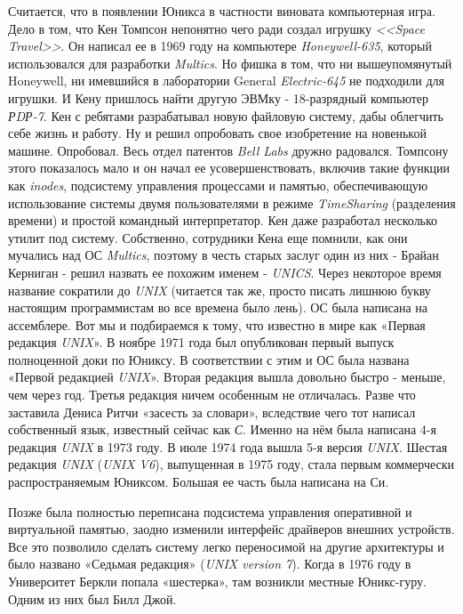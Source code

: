 Считается, что в появлении Юникса в частности виновата компьютерная игра. Дело в том, что Кен Томпсон непонятно чего ради создал игрушку \textit{<<Space Travel>>}. Он написал ее в 1969 году на компьютере \textit{Honeywell-635}, который использовался для разработки \textit{Multics}. Но фишка в том, что ни вышеупомянутый Honeywell, ни имевшийся в лаборатории General \textit{Electric-645} не подходили для игрушки. И Кену пришлось найти другую ЭВМку - 18-разрядный компьютер \textit{РDР-7}. Кен с ребятами разрабатывал новую файловую систему, дабы облегчить себе жизнь и работу. Ну и решил опробовать свое изобретение на новенькой машине. Опробовал. Весь отдел патентов \textit{Bell Labs} дружно радовался. Томпсону этого показалось мало и он начал ее усовершенствовать, включив такие функции как \textit{inodes}, подсистему управления процессами и памятью, обеспечивающую использование системы двумя пользователями в режиме \textit{TimeSharing} (разделения времени) и простой командный интерпретатор. Кен даже разработал несколько утилит под систему. Собственно, сотрудники Кена еще помнили, как они мучались над ОС \textit{Multics}, поэтому в честь старых заслуг один из них - Брайан Керниган - решил назвать ее похожим именем - \textit{UNICS}. Через некоторое время название сократили до \textit{UNIX} (читается так же, просто писать лишнюю букву настоящим программистам во все времена было лень). ОС была написана на ассемблере. Вот мы и подбираемся к тому, что известно в мире как «Первая редакция \textit{UNIX}». В ноябре 1971 года был опубликован первый выпуск полноценной доки по Юниксу. В соответствии с этим и ОС была названа «Первой редакцией \textit{UNIX}». Вторая редакция вышла довольно быстро - меньше, чем через год. Третья редакция ничем особенным не отличалась. Разве что заставила Дениса Ритчи «засесть за словари», вследствие чего тот написал собственный язык, известный сейчас как \textit{С}. Именно на нём была написана 4-я редакция \textit{UNIX} в 1973 году. В июле 1974 года вышла 5-я версия \textit{UNIX}. Шестая редакция \textit{UNIX} (\textit{UNIX V6}), выпущенная в 1975 году, стала первым коммерчески распространяемым Юниксом. Большая ее часть была написана на Си.

Позже была полностью переписана подсистема управления оперативной и виртуальной памятью, заодно изменили интерфейс драйверов внешних устройств. Все это позволило сделать систему легко переносимой на другие архитектуры и было названо «Седьмая редакция» (\textit{UNIX version 7}). Когда в 1976 году в Университет Беркли попала «шестерка», там возникли местные Юникс-гуру. Одним из них был Билл Джой.

